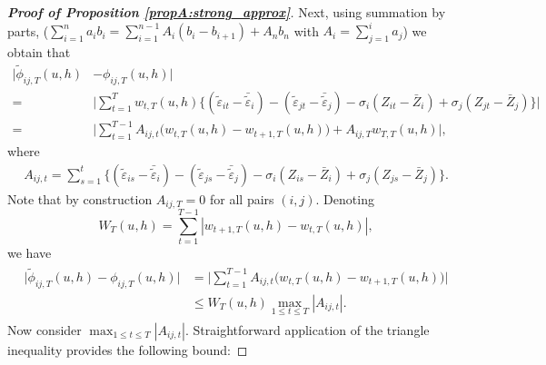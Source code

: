 \begin{proof}[\textnormal{\textbf{Proof of Proposition \ref{propA:strong_approx}}}]
Next, using summation by parts, ($\sum_{i=1}^n a_i b_i = \sum_{i=1}^{n-1} A_i (b_i - b_{i+1}) + A_n b_n$ with \linebreak $A_i = \sum_{j=1}^i a_j$) 
we obtain that 
\begin{align*}
\big| \widetilde{\phi}_{ij, T}(u,h) &- \phi_{ij, T}(u,h) \big|  \\
=&\bigg|\sum_{t=1}^T w_{t,T}(u,h) \big\{ (\widetilde{\varepsilon}_{it} - \bar{\widetilde{\varepsilon}}_i) - (\widetilde{\varepsilon}_{jt} - \bar{\widetilde{\varepsilon}}_j) -{\sigma}_i (Z_{it} - \bar{Z}_i) + {\sigma}_j (Z_{jt} - \bar{Z}_j) \big\}\bigg|  \\
=&\Big|\sum_{t=1}^{T-1} A_{ij, t} \big(w_{t,T}(u,h) -w_{t+1,T}(u,h)\big) + A_{ij, T} w_{T,T}(u,h)\Big|,
\end{align*}
where 
\begin{align*}
A_{ij, t} = \sum_{s=1}^t \big\{ (\widetilde{\varepsilon}_{is} - \bar{\widetilde{\varepsilon}}_i)  - (\widetilde{\varepsilon}_{js} - \bar{\widetilde{\varepsilon}}_j) -{\sigma}_i (Z_{is} - \bar{Z}_i) + {\sigma}_j (Z_{js} - \bar{Z}_j) \big\}.
\end{align*}
Note that by construction $A_{ij, T} = 0$ for all pairs $(i, j)$. Denoting 
\[ W_T(u,h) = \sum\limits_{t=1}^{T-1} |w_{t+1,T}(u,h) - w_{t,T}(u,h)|,\]
we have 
\begin{align}\label{eq-strongapprox-bound3}
\begin{split}
\big| \widetilde{\phi}_{ij, T}(u,h) - \phi_{ij, T}(u,h) \big| &= \Big|\sum_{t=1}^{T-1} A_{ij, t} \big(w_{t,T}(u,h) -w_{t+1,T}(u,h)\big)\Big|\\
&\le W_T(u, h)\max_{1 \le t \le T} |A_{ij, t}|.
\end{split}
\end{align}
Now consider $\max_{1 \le t \le T} |A_{ij, t}|$. Straightforward application of the triangle inequality provides the following bound:


\end{proof}
